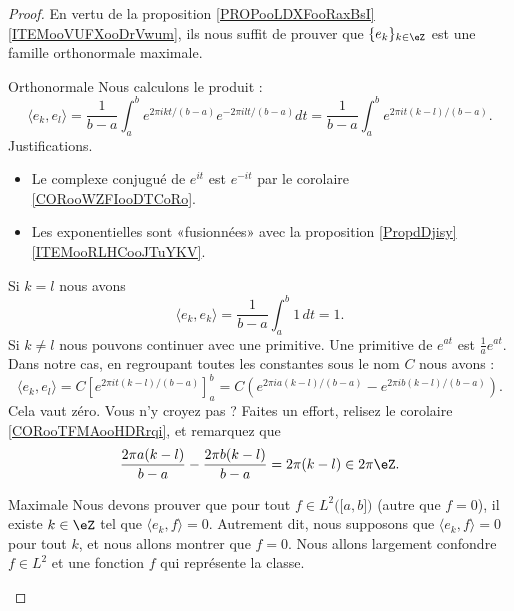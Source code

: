 \begin{proof}
    En vertu de la proposition \ref{PROPooLDXFooRaxBsI}\ref{ITEMooVUFXooDrVwum}, ils nous suffit de prouver que \( \{ e_k \}_{k\in \eZ}\) est une famille orthonormale maximale.

    \begin{subproof}
    \item[Orthonormale]
        Nous calculons le produit :
        \begin{equation}
                \langle e_k, e_l\rangle =\frac{1}{ b-a }\int_a^b e^{2\pi i kt/(b-a)} e^{-2\pi i lt/(b-a)}dt
                =\frac{1}{ b-a }\int_a^b e^{2\pi i t(k-l)/(b-a)}.
        \end{equation}
        Justifications.
        \begin{itemize}
            \item
                Le complexe conjugué de \(  e^{it}\) est \(  e^{-it}\) par le corolaire \ref{CORooWZFIooDTCoRo}.
            \item 
               Les exponentielles sont «fusionnées» avec la proposition \ref{PropdDjisy}\ref{ITEMooRLHCooJTuYKV}.   
        \end{itemize}
        Si \( k=l\) nous avons
        \begin{equation}
            \langle e_k, e_k\rangle =\frac{1}{ b-a }\int_a^b1\,dt=1.
        \end{equation}
        Si \( k\neq l\) nous pouvons continuer avec une primitive. Une primitive de \(  e^{at}\) est \( \frac{1}{ a } e^{at}\). Dans notre cas, en regroupant toutes les constantes sous le nom \( C\) nous avons :
        \begin{equation}
            \langle e_k, e_l\rangle =C\left[   e^{2\pi it(k-l)/(b-a)} \right]_a^b=C\left(  e^{2\pi i a(k-l)/(b-a)}- e^{2\pi i b(k-l)/(b-a)} \right).
        \end{equation}
        Cela vaut zéro. Vous n'y croyez pas ? Faites un effort, relisez le corolaire \ref{CORooTFMAooHDRrqi}, et remarquez que
        \begin{equation}
            \frac{ 2\pi a(k-l) }{ b-a }-\frac{ 2\pi b(k-l) }{ b-a }=2\pi (k-l)\in 2\pi \eZ.
        \end{equation}
    \item[Maximale]
        Nous devons prouver que pour tout \( f\in L^2\big( \mathopen[ a , b \mathclose] \big)\) (autre que \( f=0\)), il existe \( k\in \eZ\) tel que \( \langle e_k, f\rangle =0\). Autrement dit, nous supposons que \( \langle e_k, f\rangle =0\) pour tout \( k\), et nous allons montrer que \( f=0\). Nous allons largement confondre \( f\in L^2\) et une fonction \( f\) qui représente la classe.
    \end{subproof}
\end{proof}

